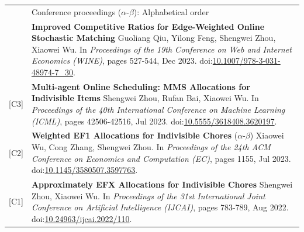\documentclass[letterpaper, 11pt]{article}
\newcommand{\headingfont}{\Large\color{OliveGreen}}
\newenvironment{SectionTable}[1]{
	\renewcommand*{\arraystretch}{1.2}
	\setlength{\tabcolsep}{8pt}
	\begin{longtable}{Rp{6.2in}} & #1 \\}
{\end{longtable}\vspace{-.7cm}}
\begin{document}
\begin{SectionTable}{\headingfont Conference proceedings \; \small\color{black}  ($\alpha$-$\beta$): Alphabetical order}
[C4] & 
\textbf{Improved Competitive Ratios for Edge-Weighted Online Stochastic Matching} \newline
Guoliang Qiu, Yilong Feng, Shengwei Zhou, Xiaowei Wu.  \newline
In \textit{Proceedings of the 19th Conference on Web and Internet Economics (WINE)}, pages 527-544, Dec 2023. doi:\href{https://link.springer.com/chapter/10.1007/978-3-031-48974-7_30}{10.1007/978-3-031-48974-7\_30}.\\

[C3] & 
\textbf{Multi-agent Online Scheduling: MMS Allocations for Indivisible Items } \newline
Shengwei Zhou, Rufan Bai, Xiaowei Wu.  \newline
In \textit{Proceedings of the 40th International Conference on Machine Learning (ICML)}, pages 42506-42516, Jul 2023. doi:\href{https://dl.acm.org/doi/10.5555/3618408.3620197}{10.5555/3618408.3620197}.\\

\vspace{-0.48cm}\hypertarget{WEF1-EC23}{[C2]}& 
\textbf{Weighted EF1 Allocations for Indivisible Chores} \newline
($\alpha$-$\beta$) Xiaowei Wu, Cong Zhang, Shengwei Zhou.  \newline
In \textit{Proceedings of the 24th ACM Conference on Economics and Computation (EC)}, pages 1155, Jul 2023. doi:\href{https://dl.acm.org/doi/10.1145/3580507.3597763}{10.1145/3580507.3597763}.\\

\vspace{-0.48cm}\hypertarget{EFX-IJCAI22}{[C1]} & 
\textbf{Approximately EFX Allocations for Indivisible Chores} \newline
Shengwei Zhou, Xiaowei Wu.  \newline
In \textit{Proceedings of the 31st International Joint Conference on Artificial Intelligence (IJCAI)}, pages 783-789, Aug 2022. doi:\href{https://www.ijcai.org/proceedings/2022/110}{10.24963/ijcai.2022/110}.\\

\end{SectionTable}
\end{document}
